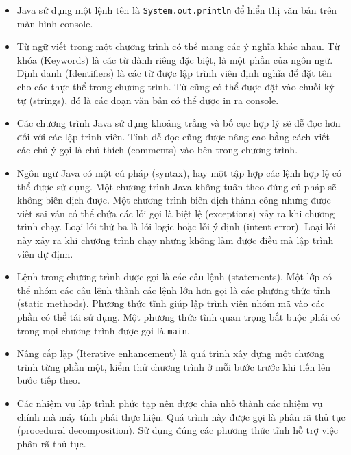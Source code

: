 \begin{itemize}
  \begin{enumerate}
  \def\labelenumi{\arabic{enumi}.}
  \tightlist
  \item
    Nhập một chương trình dưới dạng một lớp Java (Java class).
  \item
    Biên dịch (Compile) file chương trình.
  \item
    Chạy (Run) phiên bản đã biên dịch của chương trình.
  \end{enumerate}
\item
  Java sử dụng một lệnh tên là \texttt{System.out.println} để hiển thị
  văn bản trên màn hình console.
\item
  Từ ngữ viết trong một chương trình có thể mang các ý nghĩa khác nhau.
  Từ khóa (Keywords) là các từ dành riêng đặc biệt, là một phần của ngôn
  ngữ. Định danh (Identifiers) là các từ được lập trình viên định nghĩa
  để đặt tên cho các thực thể trong chương trình. Từ cũng có thể được
  đặt vào chuỗi ký tự (strings), đó là các đoạn văn bản có thể được in
  ra console.
\item
  Các chương trình Java sử dụng khoảng trắng và bố cục hợp lý sẽ dễ đọc
  hơn đối với các lập trình viên. Tính dễ đọc cũng được nâng cao bằng
  cách viết các chú ý gọi là chú thích (comments) vào bên trong chương
  trình.
\item
  Ngôn ngữ Java có một cú pháp (syntax), hay một tập hợp các lệnh hợp lệ
  có thể được sử dụng. Một chương trình Java không tuân theo đúng cú
  pháp sẽ không biên dịch được. Một chương trình biên dịch thành công
  nhưng được viết sai vẫn có thể chứa các lỗi gọi là biệt lệ
  (exceptions) xảy ra khi chương trình chạy. Loại lỗi thứ ba là lỗi
  logic hoặc lỗi ý định (intent error). Loại lỗi này xảy ra khi chương
  trình chạy nhưng không làm được điều mà lập trình viên dự định.
\item
  Lệnh trong chương trình được gọi là các câu lệnh (statements). Một lớp
  có thể nhóm các câu lệnh thành các lệnh lớn hơn gọi là các phương thức
  tĩnh (static methods). Phương thức tĩnh giúp lập trình viên nhóm mã
  vào các phần có thể tái sử dụng. Một phương thức tĩnh quan trọng bắt
  buộc phải có trong mọi chương trình được gọi là \texttt{main}.
\item
  Nâng cấp lặp (Iterative enhancement) là quá trình xây dựng một chương
  trình từng phần một, kiểm thử chương trình ở mỗi bước trước khi tiến
  lên bước tiếp theo.
\item
  Các nhiệm vụ lập trình phức tạp nên được chia nhỏ thành các nhiệm vụ
  chính mà máy tính phải thực hiện. Quá trình này được gọi là phân rã
  thủ tục (procedural decomposition). Sử dụng đúng các phương thức tĩnh
  hỗ trợ việc phân rã thủ tục.
\end{itemize}

